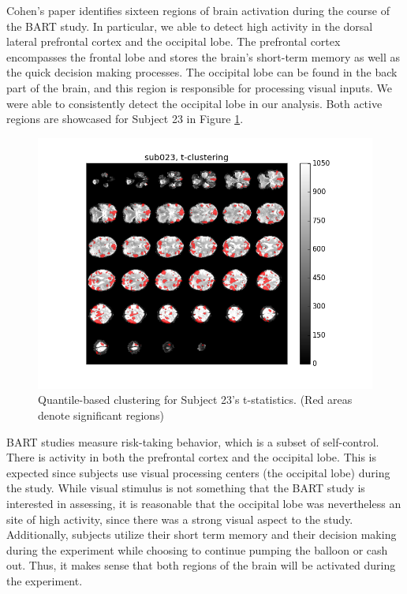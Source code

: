 \par \indent Cohen's paper identifies sixteen regions of brain activation 
during the course of the BART study. In particular, we able to detect 
high activity in the dorsal lateral prefrontal cortex and the occipital lobe. 
The prefrontal cortex encompasses the frontal lobe and stores 
the brain's short-term memory as well as the quick decision making processes. 
The occipital lobe can be found in the back part of the brain, and this region
is responsible for processing visual inputs. We were able to consistently detect
the occipital lobe in our analysis. Both active regions are showcased 
for Subject 23 in Figure \ref{fig:clustersub23}.

\begin{figure}[ht]
\centering
	\includegraphics[width=.8\linewidth]{../images/sub023_t_overlay.png} 
	\caption{Quantile-based clustering for Subject 23's t-statistics. 
	(Red areas denote significant regions)}
	\label{fig:clustersub23}
\end{figure}

\par BART studies measure risk-taking behavior, which is a subset of 
self-control. There is activity in both the prefrontal cortex and the 
occipital lobe. This is expected since subjects use visual processing 
centers (the occipital lobe) during the study. While 
visual stimulus is not something that the BART study is interested in 
assessing, it is reasonable that the occipital lobe was nevertheless an site 
of high activity, since there was a strong visual aspect to the study. 
Additionally, subjects utilize 
their short term memory and their decision making during the experiment while
choosing to continue pumping the balloon or cash out. Thus, it makes sense 
that both regions of the brain will be activated during the experiment. 

